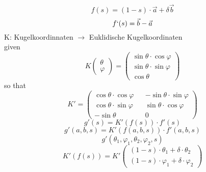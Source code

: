 \begin{equation}
f(s)=(1-s)\cdot\vec{a}+\delta\vec{b}
\end{equation}
\begin{equation}
    f`(s)=\vec{b}-\vec{a}
\end{equation}
K: Kugelkoordinnaten $\rightarrow$ Euklidische Kugelkoordinaten\\
given
\begin{equation*}
    K \begin{pmatrix}\theta \\ \varphi\end{pmatrix}=
    \begin{pmatrix}
        \sin\theta\cdot\cos\varphi \\
        \sin\theta\cdot\sin\varphi \\
        \cos\theta
    \end{pmatrix}
\end{equation*}
so that
\begin{equation}
    K'=
    \begin{pmatrix}
       \cos\theta\cdot\cos\varphi && -\sin\theta\cdot\sin\varphi \\
       \cos\theta\cdot\sin\varphi && \sin\theta\cdot\cos\varphi \\
       -\sin\theta && 0
    \end{pmatrix}
\end{equation}
\begin{equation}
    g'(s) = K'(f(s))\cdot f'(s)
\end{equation}
\begin{equation}
    g'(a,b,s) = K'(f(a,b,s))\cdot f'(a,b,s)
\end{equation}
\begin{equation}
    g'(\theta_1,\varphi_1,\theta_2,\varphi_2,s)
\end{equation}
\begin{equation}
    K'(f(s))=K'
    \begin{pmatrix}
        (1-s)\cdot\theta_1 + \delta\cdot\theta_2 \\
        (1-s)\cdot\varphi_1 + \delta\cdot\varphi_2
    \end{pmatrix}
\end{equation}

